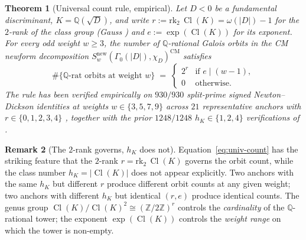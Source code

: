 \documentclass[11pt,a4paper]{amsart}
\theoremstyle{plain}
\newtheorem{theorem}{Theorem}[section]
\theoremstyle{definition}
\newtheorem{remark}[theorem]{Remark}
\DeclareMathOperator{\Cl}{Cl}
\newcommand{\Q}{\mathbb{Q}}
\newcommand{\Z}{\mathbb{Z}}
\newcommand{\absD}{\lvert D\rvert}
\begin{document}
\begin{theorem}[Universal count rule, empirical]\label{thm:univ-count}
Let $D < 0$ be a fundamental discriminant, $K = \Q(\sqrt{D})$, and write
$r := \mathrm{rk}_2\,\Cl(K) = \omega(\absD) - 1$ for the $2$-rank of the
class group (Gauss \cite[\S\S 225--237]{Gauss1801}) and
$e := \exp(\Cl(K))$ for its exponent. For every odd weight $w \ge 3$, the
number of $\Q$-rational Galois orbits in the CM newform decomposition
$S_w^{\mathrm{new}}(\Gamma_0(\absD), \chi_D)^{\mathrm{CM}}$ satisfies
\begin{equation}\label{eq:univ-count}
   \#\{\Q\text{-rat orbits at weight }w\}
   \;=\;
   \begin{cases}
     2^{r} & \text{if } e \mid (w-1), \\
     0     & \text{otherwise.}
   \end{cases}
\end{equation}
The rule has been verified empirically on $930/930$ split-prime signed
Newton--Dickson identities at weights $w \in \{3, 5, 7, 9\}$ across $21$
representative anchors with $r \in \{0, 1, 2, 3, 4\}$
\cite{Remondiere2026ND}, together with the prior $1248/1248$ $h_K \in
\{1, 2, 4\}$ verifications of \cite[\S 2--3]{Remondiere2026ND}.
\end{theorem}

\begin{remark}[The $2$-rank governs, $h_K$ does not]\label{rem:rk2-vs-hK}
Equation~\eqref{eq:univ-count} has the striking feature that the
$2$-rank $r = \mathrm{rk}_2\,\Cl(K)$ governs the orbit count, while the
class number $h_K = \lvert\Cl(K)\rvert$ does not appear explicitly. Two
anchors with the same $h_K$ but different $r$ produce different orbit
counts at any given weight; two anchors with different $h_K$ but
identical $(r, e)$ produce identical counts. The genus group
$\Cl(K)/\Cl(K)^2 \cong (\Z/2\Z)^r$ controls the \emph{cardinality} of the
$\Q$-rational tower; the exponent $\exp(\Cl(K))$ controls the
\emph{weight range} on which the tower is non-empty.
\end{remark}
\end{document}
